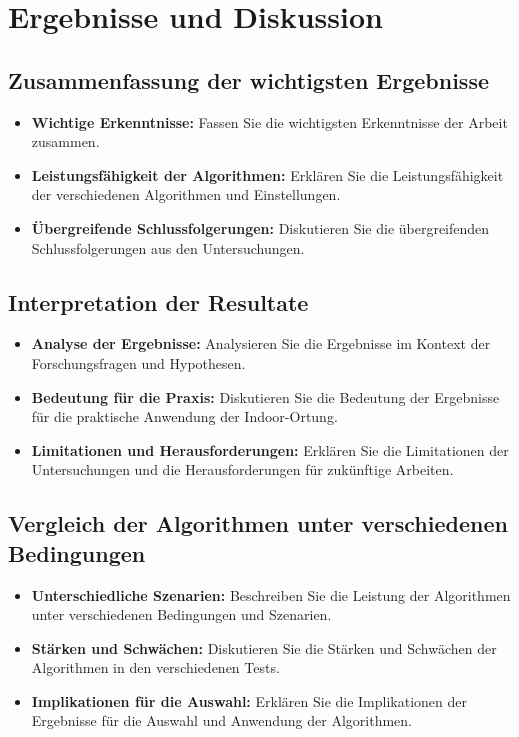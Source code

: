 \chapter{Ergebnisse und Diskussion}

\section{Zusammenfassung der wichtigsten Ergebnisse}
\begin{itemize}
    \item \textbf{Wichtige Erkenntnisse:} Fassen Sie die wichtigsten Erkenntnisse der Arbeit zusammen.
    \item \textbf{Leistungsfähigkeit der Algorithmen:} Erklären Sie die Leistungsfähigkeit der verschiedenen Algorithmen und Einstellungen.
    \item \textbf{Übergreifende Schlussfolgerungen:} Diskutieren Sie die übergreifenden Schlussfolgerungen aus den Untersuchungen.
\end{itemize}

\section{Interpretation der Resultate}
\begin{itemize}
    \item \textbf{Analyse der Ergebnisse:} Analysieren Sie die Ergebnisse im Kontext der Forschungsfragen und Hypothesen.
    \item \textbf{Bedeutung für die Praxis:} Diskutieren Sie die Bedeutung der Ergebnisse für die praktische Anwendung der Indoor-Ortung.
    \item \textbf{Limitationen und Herausforderungen:} Erklären Sie die Limitationen der Untersuchungen und die Herausforderungen für zukünftige Arbeiten.
\end{itemize}

\section{Vergleich der Algorithmen unter verschiedenen Bedingungen}
\begin{itemize}
    \item \textbf{Unterschiedliche Szenarien:} Beschreiben Sie die Leistung der Algorithmen unter verschiedenen Bedingungen und Szenarien.
    \item \textbf{Stärken und Schwächen:} Diskutieren Sie die Stärken und Schwächen der Algorithmen in den verschiedenen Tests.
    \item \textbf{Implikationen für die Auswahl:} Erklären Sie die Implikationen der Ergebnisse für die Auswahl und Anwendung der Algorithmen.
\end{itemize}

